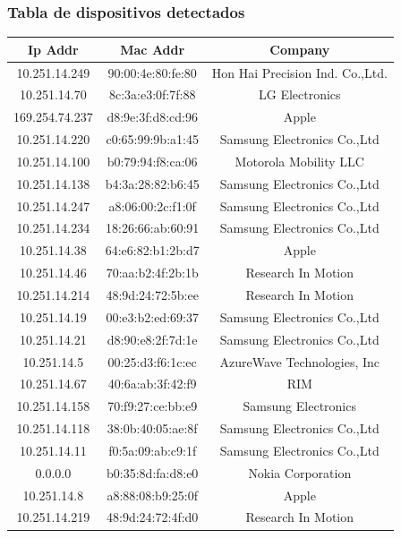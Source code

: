 \subsubsection{Tabla de dispositivos detectados}
\begin{tabular}{ |c|c|c| }
	\hline
	Ip Addr & Mac Addr & Company \\	
	\hline
	10.251.14.249 & 90:00:4e:80:fe:80 & Hon Hai Precision Ind. Co.,Ltd. \\
	\hline
	10.251.14.70 & 8c:3a:e3:0f:7f:88 & LG Electronics \\
	\hline
	169.254.74.237 & d8:9e:3f:d8:cd:96 & Apple \\
	\hline
	10.251.14.220 & c0:65:99:9b:a1:45 & Samsung Electronics Co.,Ltd \\
	\hline
	10.251.14.100 & b0:79:94:f8:ca:06 & Motorola Mobility LLC \\
	\hline
	10.251.14.138 & b4:3a:28:82:b6:45 & Samsung Electronics Co.,Ltd \\
	\hline
	10.251.14.247 & a8:06:00:2c:f1:0f & Samsung Electronics Co.,Ltd \\
	\hline
	10.251.14.234 & 18:26:66:ab:60:91 & Samsung Electronics Co.,Ltd \\
	\hline
	10.251.14.38 & 64:e6:82:b1:2b:d7 & Apple \\
	\hline
	10.251.14.46 & 70:aa:b2:4f:2b:1b & Research In Motion \\
	\hline
	10.251.14.214 & 48:9d:24:72:5b:ee & Research In Motion \\
	\hline
	10.251.14.19 & 00:e3:b2:ed:69:37 & Samsung Electronics Co.,Ltd \\
	\hline
	10.251.14.21 & d8:90:e8:2f:7d:1e & Samsung Electronics Co.,Ltd \\
	\hline
	10.251.14.5 & 00:25:d3:f6:1c:ec & AzureWave Technologies, Inc \\
	\hline
	10.251.14.67 & 40:6a:ab:3f:42:f9 & RIM \\
	\hline
	10.251.14.158 & 70:f9:27:ce:bb:e9 & Samsung Electronics \\
	\hline
	10.251.14.118 & 38:0b:40:05:ae:8f & Samsung Electronics Co.,Ltd \\
	\hline
	10.251.14.11 & f0:5a:09:ab:c9:1f & Samsung Electronics Co.,Ltd \\
	\hline
	0.0.0.0 & b0:35:8d:fa:d8:e0 & Nokia Corporation \\
	\hline
	10.251.14.8 & a8:88:08:b9:25:0f & Apple \\
	\hline
	10.251.14.219 & 48:9d:24:72:4f:d0 & Research In Motion \\
	\hline
\end{tabular}

